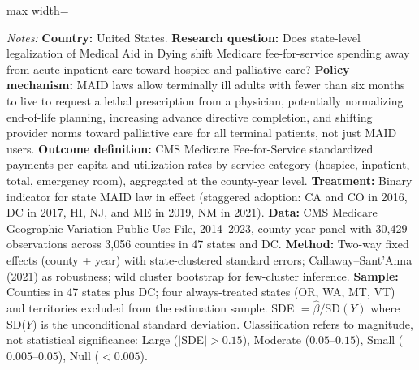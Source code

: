 \begin{table}[H]
\begin{adjustbox}{max width=\textwidth}
\begin{threeparttable}
\begin{tablenotes}[flushleft]
\item \textit{Notes:} \textbf{Country:} United States. \textbf{Research question:} Does state-level legalization of Medical Aid in Dying shift Medicare fee-for-service spending away from acute inpatient care toward hospice and palliative care? \textbf{Policy mechanism:} MAID laws allow terminally ill adults with fewer than six months to live to request a lethal prescription from a physician, potentially normalizing end-of-life planning, increasing advance directive completion, and shifting provider norms toward palliative care for all terminal patients, not just MAID users. \textbf{Outcome definition:} CMS Medicare Fee-for-Service standardized payments per capita and utilization rates by service category (hospice, inpatient, total, emergency room), aggregated at the county-year level. \textbf{Treatment:} Binary indicator for state MAID law in effect (staggered adoption: CA and CO in 2016, DC in 2017, HI, NJ, and ME in 2019, NM in 2021). \textbf{Data:} CMS Medicare Geographic Variation Public Use File, 2014--2023, county-year panel with 30,429 observations across 3,056 counties in 47 states and DC. \textbf{Method:} Two-way fixed effects (county + year) with state-clustered standard errors; Callaway--Sant'Anna (2021) as robustness; wild cluster bootstrap for few-cluster inference. \textbf{Sample:} Counties in 47 states plus DC; four always-treated states (OR, WA, MT, VT) and territories excluded from the estimation sample. SDE $= \hat{\beta} / \text{SD}(Y)$ where SD($Y$) is the unconditional standard deviation. Classification refers to magnitude, not statistical significance: Large ($|$SDE$| > 0.15$), Moderate ($0.05$--$0.15$), Small ($0.005$--$0.05$), Null ($< 0.005$).
\end{tablenotes}
\end{threeparttable}
\end{adjustbox}
\end{table}
